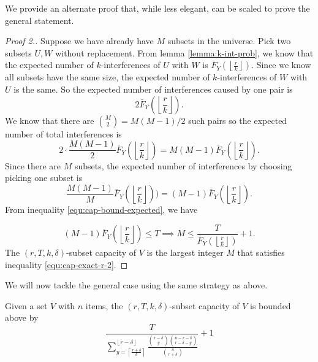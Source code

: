     We provide an alternate proof that, while less elegant, can be scaled to prove the general statement. 

    \begin{proof}[Proof 2.]
        Suppose we have already have $M$ subsets in the universe. Pick two subsets $U,W$ without replacement. From lemma \ref{lemma:k-int-prob}, we know that the expected number of $k$-interferences of $U$ with $W$ is $\bar{F}_Y\left(\left\lfloor \frac{r}{k} \right\rfloor\right)$. Since we know all subsets have the same size, the expected number of $k$-interferences of $W$ with $U$ is the same. So the expected number of interferences caused by one pair is
    $$
    2\bar{F}_Y\left(\left\lfloor \frac{r}{k} \right\rfloor\right).
    $$
    We know that there are $\binom{M}{2} = M(M-1)/2$ such pairs so the expected number of total interferences is
    $$
    2 \cdot \frac{M(M-1)}{2} \bar{F}_Y\left(\left\lfloor \frac{r}{k} \right\rfloor\right)  =  M(M-1) \bar{F}_Y\left(\left\lfloor \frac{r}{k} \right\rfloor\right). 
    $$
    Since there are $M$ subsets, the expected number of interferences by choosing picking one subset is
    $$
    \frac{M(M-1)}{M} \bar{F}_Y\left(\left\lfloor \frac{r}{k} \right\rfloor\right))  = (M-1) \bar{F}_Y\left(\left\lfloor \frac{r}{k} \right\rfloor\right).
    $$
    From inequality \ref{equ:cap-bound-expected}, we have 

    \begin{equation}
        \label{equ:cap-exact-r-2}
        (M-1) \bar{F}_Y\left(\left\lfloor \frac{r}{k} \right\rfloor\right) \le T \implies M \le \frac{T}{\bar{F}_Y\left(\left\lfloor \frac{r}{k} \right\rfloor\right)} + 1.
    \end{equation}
The $(r,T,k,\delta)$-subset capacity of $V$ is the largest integer $M$ that satisfies inequality \ref{equ:cap-exact-r-2}.
    \end{proof}

We will now tackle the general case using the same strategy as above. 

\begin{theorem}
    \label{thm:bounded-r}
    Given a set $V$ with $n$ items, the $(r,T,k,\delta)$-subset capacity of $V$ is bounded above by
    \begin{equation*}
     \frac{T}{\sum_{y = \left\lceil \frac{r+\delta}{k} \right\rceil}^{\left\lfloor r - \delta \right\rfloor} \frac{\binom{r-\delta}{y} \binom{n-r-\delta}{r-\delta-y}}{\binom{n}{r+\delta}}} + 1
    \end{equation*}
\end{theorem}

